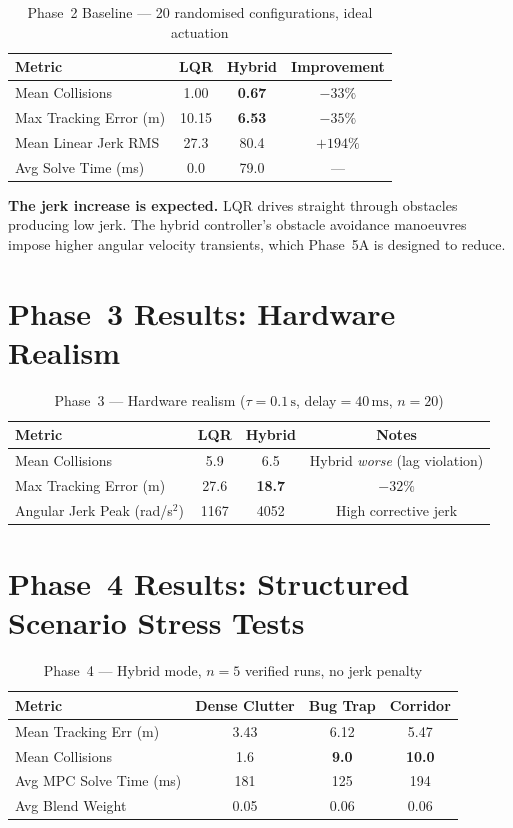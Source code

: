 \documentclass[12pt,a4paper,oneside]{report}
\begin{document}
\begin{table}[!ht]
\centering
\caption{Phase~2 Baseline — 20 randomised configurations, ideal actuation}
\label{tab:phase2}
\begin{tabular}{lccc}
\toprule
Metric & LQR & Hybrid & Improvement \\
\midrule
Mean Collisions & 1.00 & \textbf{0.67} & $-33\%$ \\
Max Tracking Error (m) & 10.15 & \textbf{6.53} & $-35\%$ \\
Mean Linear Jerk RMS & 27.3 & 80.4 & $+194\%$ \\
Avg Solve Time (ms) & 0.0 & 79.0 & --- \\
\bottomrule
\end{tabular}
\end{table}

\begin{notebox}
  \textbf{The jerk increase is expected.} LQR drives straight through
  obstacles producing low jerk. The hybrid controller's obstacle avoidance
  manoeuvres impose higher angular velocity transients, which Phase~5A is
  designed to reduce.
\end{notebox}

\section{Phase~3 Results: Hardware Realism}

\begin{table}[!ht]
\centering
\caption{Phase~3 — Hardware realism ($\tau=0.1\,\text{s}$, delay$=40\,\text{ms}$, $n=20$)}
\label{tab:phase3}
\begin{tabular}{lccc}
\toprule
Metric & LQR & Hybrid & Notes \\
\midrule
Mean Collisions & 5.9 & 6.5 & Hybrid \textit{worse} (lag violation) \\
Max Tracking Error (m) & 27.6 & \textbf{18.7} & $-32\%$ \\
Angular Jerk Peak (rad/s$^2$) & 1167 & 4052 & High corrective jerk \\
\bottomrule
\end{tabular}
\end{table}

\section{Phase~4 Results: Structured Scenario Stress Tests}

\begin{table}[!ht]
\centering
\caption{Phase~4 — Hybrid mode, $n=5$ verified runs, no jerk penalty}
\label{tab:phase4}
\begin{tabular}{lccc}
\toprule
Metric & Dense Clutter & Bug Trap & Corridor \\
\midrule
Mean Tracking Err (m) & 3.43 & 6.12 & 5.47 \\
Mean Collisions & 1.6 & \textbf{9.0} & \textbf{10.0} \\
Avg MPC Solve Time (ms) & 181 & 125 & 194 \\
Avg Blend Weight & 0.05 & 0.06 & 0.06 \\
\bottomrule
\end{tabular}
\end{table}
\end{document}
